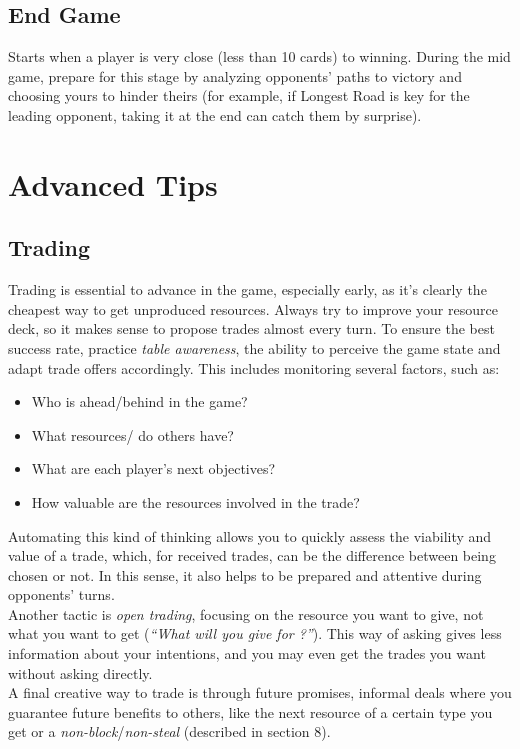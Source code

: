 \documentclass[12pt]{article}
\begin{document}
\subsection{End Game}
Starts when a player is very close (less than 10 cards) to winning.
During the mid game, prepare for this stage by analyzing opponents' paths to victory and choosing yours to hinder theirs (for example, if Longest Road is key for the leading opponent, taking it at the end can catch them by surprise).

\section{Advanced Tips}
\subsection{Trading}
Trading is essential to advance in the game, especially early, as it's clearly the cheapest way to get unproduced resources.
Always try to improve your resource deck, so it makes sense to propose trades almost every turn.
To ensure the best success rate, practice \textit{table awareness}, the ability to perceive the game state and adapt trade offers accordingly.
This includes monitoring several factors, such as:
\vspace{-0.2cm}
\begin{itemize}[noitemsep]
    \item Who is ahead/behind in the game?
    \item What resources/ do others have?
    \item What are each player's next objectives?
    \item How valuable are the resources involved in the trade?
\end{itemize}
\vspace{-0.2cm}
Automating this kind of thinking allows you to quickly assess the viability and value of a trade, which, for received trades, can be the difference between being chosen or not.
In this sense, it also helps to be prepared and attentive during opponents' turns. \\
Another tactic is \textit{open trading}, focusing on the resource you want to give, not what you want to get (\textit{``What will you give for ?''}).
This way of asking gives less information about your intentions, and you may even get the trades you want without asking directly. \\
A final creative way to trade is through future promises, informal deals where you guarantee future benefits to others, like the next resource of a certain type you get or a \textit{non-block}/\textit{non-steal} (described in section 8).
\end{document}
